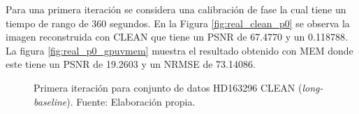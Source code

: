 Para una primera iteración se considera una calibración de fase la cual tiene un tiempo de rango de 360 segundos. En la Figura \ref{fig:real_clean_p0} se observa la imagen reconstruida con CLEAN que tiene un PSNR de 67.4770 y un 0.118788. La figura \ref{fig:real_p0_gpuvmem} muestra el resultado obtenido con MEM donde este tiene un PSNR de 19.2603 y un NRMSE de 73.14086.

\begin{figure}[!ht]
 \centering
    \vspace{0.3cm}
 \caption[Primera iteración para conjunto de datos HD163296 CLEAN (\textit{long-baseline})]{Primera iteración para conjunto de datos HD163296 CLEAN (\textit{long-baseline}). Fuente: Elaboración propia.}
 \label{fig:real_p0_clean}
\end{figure}

